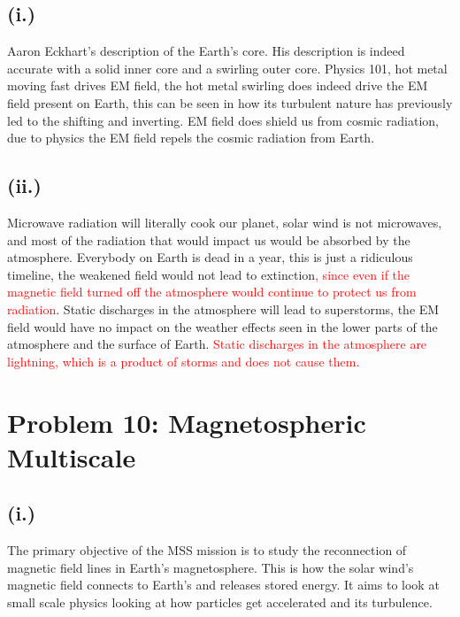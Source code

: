 \documentclass[11pt]{article}
\begin{document}
\subsection*{(i.)}
\hspace*{2em}Aaron Eckhart's description of the Earth's core. His description is indeed accurate with a solid inner core and a swirling outer core. Physics 101, hot metal moving fast drives EM field, the hot metal swirling does indeed drive the EM field present on Earth, this can be seen in how its turbulent nature has previously led to the shifting and inverting. EM field does shield us from cosmic radiation, due to physics the EM field repels the cosmic radiation from Earth.

\subsection*{(ii.)}
\hspace*{2em}Microwave radiation will literally cook our planet, solar wind is not microwaves, and most of the radiation that would impact us would be absorbed by the atmosphere. Everybody on Earth is dead in a year, this is just a ridiculous timeline, the weakened field would not lead to extinction\textcolor{red}{, since even if the magnetic field turned off the atmosphere would continue to protect us from radiation}. Static discharges in the atmosphere will lead to superstorms, the EM field would have no impact on the weather effects seen in the lower parts of the atmosphere and the surface of Earth. \textcolor{red}{Static discharges in the atmosphere are lightning, which is a product of storms and does not cause them.}

\newpage
\section*{Problem 10: Magnetospheric Multiscale}

\subsection*{(i.)}
\hspace*{2em}The primary objective of the MSS mission is to study the reconnection of magnetic field lines in Earth's magnetosphere. This is how the solar wind's magnetic field connects to Earth's and releases stored energy. It aims to look at small scale physics looking at how particles get accelerated and its turbulence. 
\end{document}
